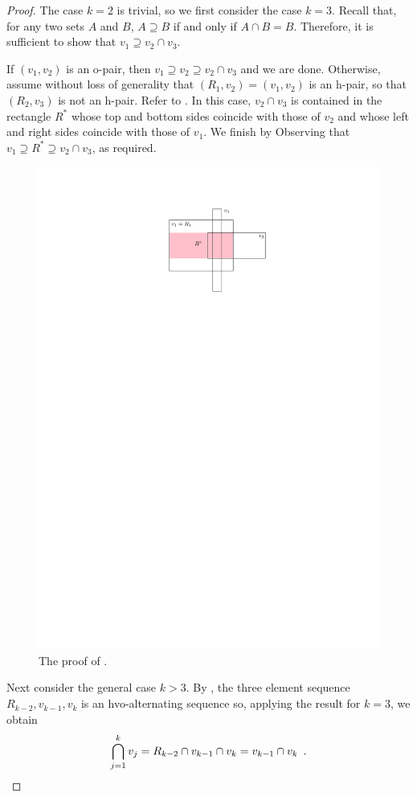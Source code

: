 \documentclass[lotsofwhite]{patmorin}
\begin{document}
\begin{proof}
  The case $k=2$ is trivial, so we first consider the case $k=3$.
  Recall that, for any two sets $A$ and $B$, $A\supseteq B$ if and only
  if $A\cap B = B$. Therefore, it is sufficient to show that $v_1\supseteq
  v_2\cap v_3$.

  If $(v_1,v_2)$ is an o-pair, then $v_1\supseteq v_2\supseteq v_2\cap
  v_3$ and we are done.  Otherwise, assume without loss of generality
  that $(R_1,v_2)=(v_1,v_2)$ is an h-pair, so that $(R_2,v_3)$ is not an
  h-pair. Refer to .  In this case, $v_2\cap v_3$ is
  contained in the rectangle $R^*$ whose top and bottom sides coincide
  with those of $v_2$ and whose left and right sides coincide with
  those of $v_1$. We finish by Observing that $v_1\supseteq R^*\supseteq
  v_2\cap v_3$, as required.

  \begin{figure}
    \begin{center}
      \includegraphics{figs/geometric}
    \end{center}
    \caption{The proof of .}
  \end{figure}

  Next consider the general case $k> 3$.
  By , the three element sequence
  $R_{k-2},v_{k-1},v_k$ is an hvo-alternating sequence so, applying 
  the result for $k=3$, we obtain
  \[  
   \bigcap_{j=1}^k v_j = R_{k-2}\cap v_{k-1}\cap v_k = v_{k-1}\cap v_k
   \enspace .  \qedhere 
  \]
\end{proof}
\end{document}
